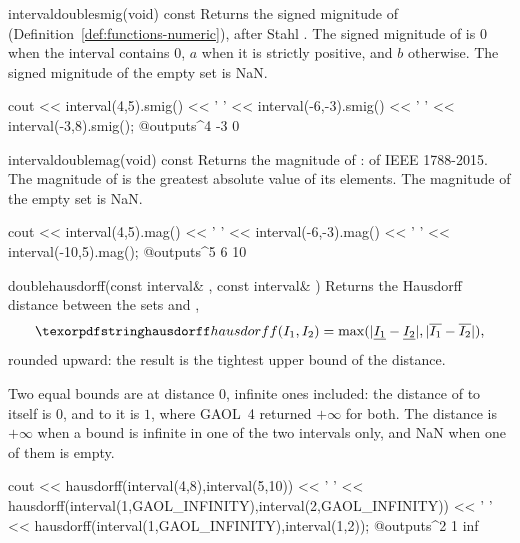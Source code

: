 \begin{defmethod}{interval}{double}{smig}{(void) const}
  Returns the signed mignitude of 
  (Definition~\ref{def:functions-numeric}), after Stahl
  \cite[def.~1.3.28]{Stahl:PhD}. The signed mignitude of  is $0$
  when the interval contains $0$, $a$ when it is strictly positive, and $b$
  otherwise. The signed mignitude of the empty set is NaN.
\begin{example}
cout << interval(4,5).smig() << ' '
     << interval(-6,-3).smig() << ' '
     << interval(-3,8).smig();
@outputs^4 -3 0~
\end{example}
\end{defmethod}

\begin{defmethod}{interval}{double}{mag}{(void) const}
  Returns the magnitude of :  of IEEE 1788-2015. The
  magnitude of  is the greatest absolute value of its elements.
  The magnitude of the empty set is NaN.
\begin{example}
cout << interval(4,5).mag() << ' '
     << interval(-6,-3).mag() << ' '
     << interval(-10,5).mag();
@outputs^5 6 10~
\end{example}
\end{defmethod}

\begin{deffun}{double}{hausdorff}{(const interval\& , const interval\& )}
  Returns the Hausdorff distance between the sets  and ,
\begin{equation*}
\code{hausdorff}(I_1,I_2)=\max(|\leftBound{I_1}-\leftBound{I_2}|,
                          |\rightBound{I_1}-\rightBound{I_2}|),
\end{equation*}
  rounded upward: the result is the tightest upper bound of the
  distance.\newinvfive

  Two equal bounds are at distance $0$, infinite ones included: the
  distance of  to itself is $0$, and to  it
  is $1$, where GAOL~4 returned $+\infty$ for both. The distance is
  $+\infty$ when a bound is infinite in one of the two intervals only, and
  NaN when one of them is empty.\newinvfive
\begin{example}
cout << hausdorff(interval(4,8),interval(5,10)) << ' '
     << hausdorff(interval(1,GAOL_INFINITY),interval(2,GAOL_INFINITY)) << ' '
     << hausdorff(interval(1,GAOL_INFINITY),interval(1,2));
@outputs^2 1 inf~
\end{example}
\end{deffun}

